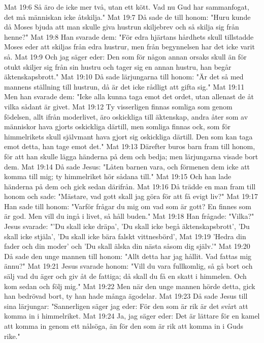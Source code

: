Mat 19:6  Så äro de icke mer två, utan ett kött. Vad nu Gud har sammanfogat, det må människan icke åtskilja."
Mat 19:7  Då sade de till honom: "Huru kunde då Moses bjuda att man skulle giva hustrun skiljebrev och så skilja sig från henne?"
Mat 19:8  Han svarade dem: "För edra hjärtans hårdhets skull tillstadde Moses eder att skiljas från edra hustrur, men från begynnelsen har det icke varit så.
Mat 19:9  Och jag säger eder: Den som för någon annan orsaks skull än för otukt skiljer sig från sin hustru och tager sig en annan hustru, han begår äktenskapsbrott."
Mat 19:10  Då sade lärjungarna till honom: "Är det så med mannens ställning till hustrun, då är det icke rådligt att gifta sig."
Mat 19:11  Men han svarade dem: "Icke alla kunna taga emot det ordet, utan allenast de åt vilka sådant är givet.
Mat 19:12  Ty visserligen finnas somliga som genom födelsen, allt ifrån moderlivet, äro oskickliga till äktenskap, andra åter som av människor hava gjorts oskickliga därtill, men somliga finnas ock, som för himmelrikets skull självmant hava gjort sig oskickliga därtill. Den som kan taga emot detta, han tage emot det."
Mat 19:13  Därefter buros barn fram till honom, för att han skulle lägga händerna på dem och bedja; men lärjungarna visade bort dem.
Mat 19:14  Då sade Jesus: "Låten barnen vara, och förmenen dem icke att komma till mig; ty himmelriket hör sådana till."
Mat 19:15  Och han lade händerna på dem och gick sedan därifrån.
Mat 19:16  Då trädde en man fram till honom och sade: "Mästare, vad gott skall jag göra för att få evigt liv?"
Mat 19:17  Han sade till honom: "Varför frågar du mig om vad som är gott? En finnes som är god. Men vill du ingå i livet, så håll buden."
Mat 19:18  Han frågade: "Vilka?" Jesus svarade: "'Du skall icke dräpa', 'Du skall icke begå äktenskapsbrott', 'Du skall icke stjäla', 'Du skall icke bära falskt vittnesbörd',
Mat 19:19  'Hedra din fader och din moder' och 'Du skall älska din nästa såsom dig själv.'"
Mat 19:20  Då sade den unge mannen till honom: "Allt detta har jag hållit. Vad fattas mig ännu?"
Mat 19:21  Jesus svarade honom: "Vill du vara fullkomlig, så gå bort och sälj vad du äger och giv åt de fattiga; då skall du få en skatt i himmelen. Och kom sedan och följ mig."
Mat 19:22  Men när den unge mannen hörde detta, gick han bedrövad bort, ty han hade många ägodelar.
Mat 19:23  Då sade Jesus till sina lärjungar: "Sannerligen säger jag eder: För den som är rik är det svårt att komma in i himmelriket.
Mat 19:24  Ja, jag säger eder: Det är lättare för en kamel att komma in genom ett nålsöga, än för den som är rik att komma in i Guds rike."

